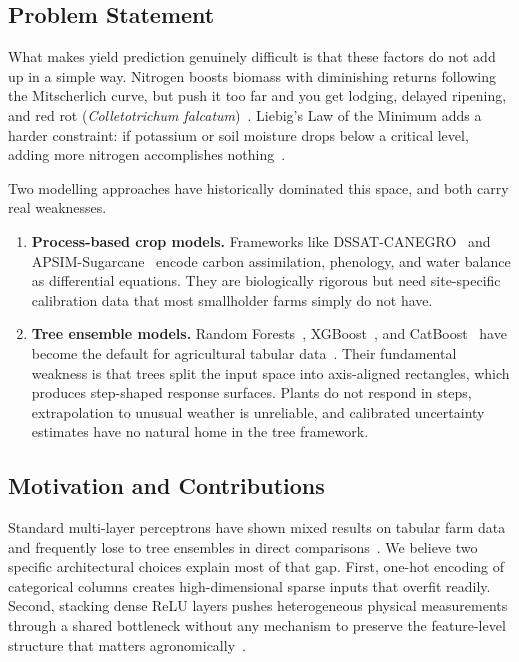 \documentclass[conference,10pt,letterpaper]{IEEEtran}
\begin{document}
\subsection{Problem Statement}
What makes yield prediction genuinely difficult is that these factors do not add up in a simple way. Nitrogen boosts biomass with diminishing returns following the Mitscherlich curve, but push it too far and you get lodging, delayed ripening, and red rot (\textit{Colletotrichum falcatum})~\cite{socadagui2026spatial}. Liebig's Law of the Minimum adds a harder constraint: if potassium or soil moisture drops below a critical level, adding more nitrogen accomplishes nothing~\cite{everingham2016accurate,inman2005sugarcane}.

Two modelling approaches have historically dominated this space, and both carry real weaknesses.
\begin{enumerate}
    \item \textbf{Process-based crop models.} Frameworks like DSSAT-CANEGRO~\cite{singels2005modelling} and APSIM-Sugarcane~\cite{keating1999modelling} encode carbon assimilation, phenology, and water balance as differential equations. They are biologically rigorous but need site-specific calibration data that most smallholder farms simply do not have.
    \item \textbf{Tree ensemble models.} Random Forests~\cite{breiman2001random}, XGBoost~\cite{chen2016xgboost}, and CatBoost~\cite{prokhorenkova2018catboost} have become the default for agricultural tabular data~\cite{van2020crop,silva2020sugarcane}. Their fundamental weakness is that trees split the input space into axis-aligned rectangles, which produces step-shaped response surfaces. Plants do not respond in steps, extrapolation to unusual weather is unreliable, and calibrated uncertainty estimates have no natural home in the tree framework.
\end{enumerate}

\subsection{Motivation and Contributions}
Standard multi-layer perceptrons have shown mixed results on tabular farm data and frequently lose to tree ensembles in direct comparisons~\cite{shwartz2022tabular,borisov2022deep}. We believe two specific architectural choices explain most of that gap. First, one-hot encoding of categorical columns creates high-dimensional sparse inputs that overfit readily. Second, stacking dense ReLU layers pushes heterogeneous physical measurements through a shared bottleneck without any mechanism to preserve the feature-level structure that matters agronomically~\cite{gorishniy2021revisiting}.
\end{document}
